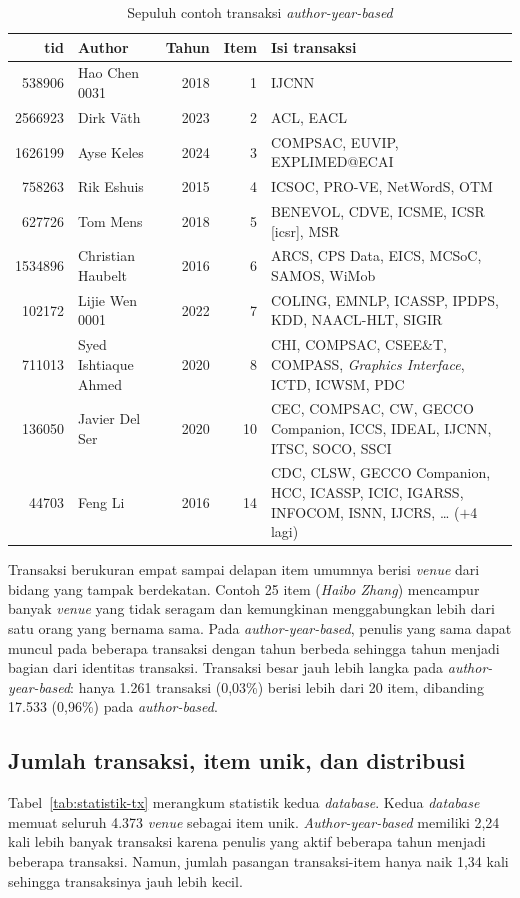 \begin{table}[ht]
\caption{Sepuluh contoh transaksi \textit{author-year-based}}
\label{tab:contoh-ay}
\footnotesize
\begin{tabularx}{\textwidth}{@{}rlrrX@{}}
\toprule
\textbf{tid} & \textbf{Author} & \textbf{Tahun} & \textbf{Item} & \textbf{Isi transaksi} \\
\midrule
538906 & Hao Chen 0031 & 2018 & 1 & IJCNN \\
2566923 & Dirk Väth & 2023 & 2 & ACL, EACL \\
1626199 & Ayse Keles & 2024 & 3 & COMPSAC, EUVIP, EXPLIMED@ECAI \\
758263 & Rik Eshuis & 2015 & 4 & ICSOC, PRO-VE, NetWordS, OTM \\
627726 & Tom Mens & 2018 & 5 & BENEVOL, CDVE, ICSME, ICSR [icsr], MSR \\
1534896 & Christian Haubelt & 2016 & 6 & ARCS, CPS Data, EICS, MCSoC, SAMOS, WiMob \\
102172 & Lijie Wen 0001 & 2022 & 7 & COLING, EMNLP, ICASSP, IPDPS, KDD, NAACL-HLT, SIGIR \\
711013 & Syed Ishtiaque Ahmed & 2020 & 8 & CHI, COMPSAC, CSEE\&T, COMPASS, \textit{Graphics Interface}, ICTD, ICWSM, PDC \\
136050 & Javier Del Ser & 2020 & 10 & CEC, COMPSAC, CW, GECCO Companion, ICCS, IDEAL, IJCNN, ITSC, SOCO, SSCI \\
44703 & Feng Li & 2016 & 14 & CDC, CLSW, GECCO Companion, HCC, ICASSP, ICIC, IGARSS, INFOCOM, ISNN, IJCRS, \ldots{} ($+$4 lagi) \\
\bottomrule
\end{tabularx}
\end{table}

Transaksi berukuran empat sampai delapan item umumnya berisi \textit{venue} dari bidang yang tampak berdekatan. Contoh 25 item (\textit{Haibo Zhang}) mencampur banyak \textit{venue} yang tidak seragam dan kemungkinan menggabungkan lebih dari satu orang yang bernama sama. Pada \textit{author-year-based}, penulis yang sama dapat muncul pada beberapa transaksi dengan tahun berbeda sehingga tahun menjadi bagian dari identitas transaksi. Transaksi besar jauh lebih langka pada \textit{author-year-based}: hanya 1.261 transaksi (0,03\%) berisi lebih dari 20 item, dibanding 17.533 (0,96\%) pada \textit{author-based}.

\subsection{Jumlah transaksi, item unik, dan distribusi}
\label{sec:hasil-statistik-tx}
Tabel~\ref{tab:statistik-tx} merangkum statistik kedua \textit{database}. Kedua \textit{database} memuat seluruh 4.373 \textit{venue} sebagai item unik. \textit{Author-year-based} memiliki 2,24 kali lebih banyak transaksi karena penulis yang aktif beberapa tahun menjadi beberapa transaksi. Namun, jumlah pasangan transaksi-item hanya naik 1,34 kali sehingga transaksinya jauh lebih kecil.

